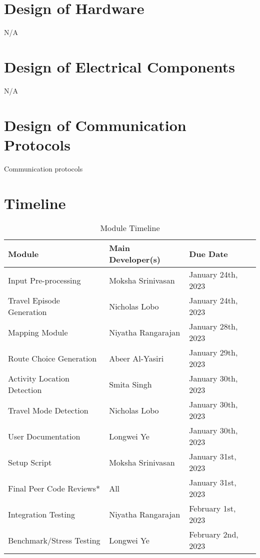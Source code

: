 \documentclass[12pt, titlepage]{article}
\begin{document}
\section{Design of Hardware}
\noindent N/A

\section{Design of Electrical Components}
\noindent N/A

\section{Design of Communication Protocols}
Communication protocols


\newpage
\section{Timeline}

\begin{table}[H] 
	\begin{tabularx}{\textwidth}{|X|X|X|}
		\hline
		\textbf{Module} & \textbf{Main Developer(s)} & \textbf{Due Date}\\
		\hline
		Input Pre-processing & Moksha Srinivasan & 
		January 24th, 2023  \\
		\hline
		Travel Episode Generation & Nicholas Lobo & 
		January 24th, 2023 \\
		\hline
		Mapping Module & Niyatha Rangarajan &
		January 28th, 2023 \\
		\hline
		Route Choice Generation & Abeer Al-Yasiri &
		January 29th, 2023 \\
		\hline
		Activity Location Detection & Smita Singh &
		January 30th, 2023 \\
		\hline 
		Travel Mode Detection & Nicholas Lobo & 
		January 30th, 2023 \\
		\hline 
		User Documentation & Longwei Ye &
		January 30th, 2023 \\
		\hline
		Setup Script & Moksha Srinivasan &
		January 31st, 2023 \\
		\hline 
	    Final Peer Code Reviews* & All &
		January 31st, 2023 \\
		\hline
		Integration Testing & Niyatha Rangarajan &
		February 1st, 2023 \\
		\hline
		Benchmark/Stress Testing & Longwei Ye & 
		February 2nd, 2023 \\
		\hline
	\end{tabularx}
	\caption{Module Timeline}
\end{table}
\end{document}
